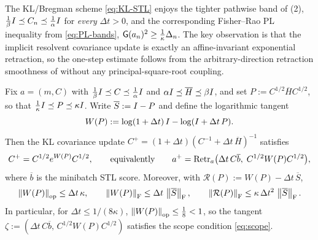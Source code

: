 The KL/Bregman scheme \eqref{eq:KL-STL} enjoys the tighter pathwise band of
(2), $\tfrac1\beta I\preceq C_n\preceq\tfrac1\alpha I$ for \emph{every}
$\Delta t>0$, and the corresponding Fisher--Rao PL inequality from \eqref{eq:PL-bands},
$\mathsf{G}(a_n)^2\geq\tfrac1\kappa\Delta_n$. The key observation is that the implicit resolvent
covariance update is exactly an affine-invariant exponential retraction, so the one-step estimate
follows from the arbitrary-direction retraction smoothness of  without any
principal-square-root coupling.

\begin{lemma}
\label{lem:KL-logtangent}
Fix $a=(m,C)$ with $\tfrac1\beta I\preceq C\preceq\tfrac1\alpha I$ and $\alpha I\preceq\overline H\preceq\beta I$,
and set $P:=C^{1/2}\overline HC^{1/2}$, so that $\tfrac1\kappa I\preceq P\preceq\kappa I$. Write
$\overline S:=I-P$ and define the logarithmic tangent
\begin{equation}
\label{eq:Wlog}
    W(P):=\log(1+\Delta t)\,I-\log(I+\Delta t\,P).
\end{equation}
Then the KL covariance update $C^+=(1+\Delta t)(C^{-1}+\Delta t\,\overline H)^{-1}$ satisfies
\begin{equation}
\label{eq:KL-retr}
    C^+=C^{1/2}e^{W(P)}C^{1/2},
    \qquad\text{equivalently}\qquad
    a^+=\operatorname{Retr}_a\bigl(\Delta t\,C\overline b,\;C^{1/2}W(P)C^{1/2}\bigr),
\end{equation}
where $\overline b$ is the minibatch STL score. Moreover, with $\mathcal R(P):=W(P)-\Delta t\,\overline S$,
\begin{equation}
\label{eq:Wlog-bounds}
    \left\lVert W(P)\right\rVert_{\mathrm{op}}\leq\Delta t\,\kappa,
    \qquad
    \left\lVert W(P)\right\rVert_{\mathrm{F}}\leq\Delta t\,\left\lVert \overline S\right\rVert_{\mathrm{F}},
    \qquad
    \left\lVert \mathcal R(P)\right\rVert_{\mathrm{F}}\leq\kappa\,\Delta t^2\,\left\lVert \overline S\right\rVert_{\mathrm{F}}.
\end{equation}
In particular, for $\Delta t\leq1/(8\kappa)$, $\left\lVert W(P)\right\rVert_{\mathrm{op}}\leq\tfrac18<1$, so the tangent
$\zeta:=(\Delta t\,C\overline b,\,C^{1/2}W(P)C^{1/2})$ satisfies the scope condition \eqref{eq:scope}.
\end{lemma}

